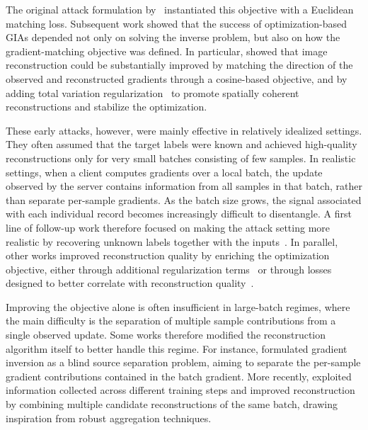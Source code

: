 The original attack formulation by~ instantiated this objective with a Euclidean matching loss. Subsequent work showed that the success of optimization-based GIAs depended not only on solving the inverse problem, but also on how the gradient-matching objective was defined. In particular,  showed that image reconstruction could be substantially improved by matching the direction of the observed and reconstructed gradients through a cosine-based objective, and by adding total variation regularization~\cite{rudin_tv} to promote spatially coherent reconstructions and stabilize the optimization.

These early attacks, however, were mainly effective in relatively idealized settings. They often assumed that the target labels were known and achieved high-quality reconstructions only for very small batches consisting of few samples. In realistic settings, when a client computes gradients over a local batch, the update observed by the server contains information from all samples in that batch, rather than separate per-sample gradients. As the batch size grows, the signal associated with each individual record becomes increasingly difficult to disentangle. A first line of follow-up work therefore focused on making the attack setting more realistic by recovering unknown labels together with the inputs~\cite{zhaoIDLGImprovedDeep2020, maINSTANCEWISEBATCHLABEL2023, gengImprovedGradientInversion2024, yeHighFidelityGradientInversion2024, liTemporalGradientInversion2025a}. In parallel, other works improved reconstruction quality by enriching the optimization objective, either through additional regularization terms~\cite{yinSeeGradientsImage2021, hatamizadehGradViTGradientInversion2022,liE2EGIEndtoEndGradient2023, gengImprovedGradientInversion2024, Fan_fedleak} or through losses designed to better correlate with reconstruction quality~\cite{wangVarianceGradientAlso2022, hongForeseeingReconstructionQuality2024, yeHighFidelityGradientInversion2024, Fan_fedleak}.

Improving the objective alone is often insufficient in large-batch regimes, where the main difficulty is the separation of multiple sample contributions from a single observed update. Some works therefore modified the reconstruction algorithm itself to better handle this regime. For instance,  formulated gradient inversion as a blind source separation problem, aiming to separate the per-sample gradient contributions contained in the batch gradient. More recently,  exploited information collected across different training steps and improved reconstruction by combining multiple candidate reconstructions of the same batch, drawing inspiration from robust aggregation techniques.

